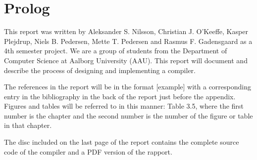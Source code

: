 \section{Prolog}
This report was written by Aleksander S. Nilsson, Christian J. O'Keeffe, Kasper Plejdrup, Niels  B. Pedersen, Mette T. Pedersen and Rasmus F. Gadensgaard as a 4th semester project. We are a group of students from the Department of Computer Science at Aalborg University (AAU). This report will document and describe the process of designing and implementing a compiler.

The references in the report will be in the format [example] with a corresponding entry in the bibliography in the back of the report just before the appendix. Figures and tables will be referred to in this manner: Table 3.5, where the first number is the chapter and the second number is the number of the figure or table in that chapter.

The disc included on the last page of the report contains the complete source code of the compiler and a PDF version of the rapport.
